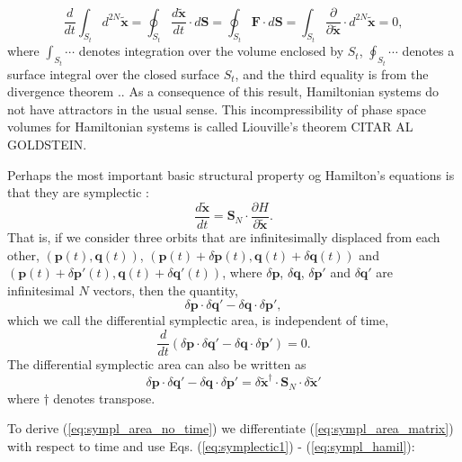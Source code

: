 \begin{equation}
\frac{d}{dt}\int_{S_t}d^{2N}\tilde{\bm{x}}= \oint_{S_t}\frac{d\tilde{\bm{x}}}{dt}\cdot d\bm{S}=\oint_{S_t}\bm{F}\cdot d\bm{S}=\int_{S_t}\frac{\partial }{\partial \tilde{\bm{x}}}\cdot d^{2N}\tilde{\bm{x}}=0,
\end{equation}
where $\int_{S_t} \cdots$ denotes integration over the volume enclosed by $S_t$, $ \oint_{S_t}\cdots$ denotes a surface integral over the closed surface $S_t$, and the third equality is from the divergence theorem \cite{ottChaosDynamicalSystems2002}.. As a consequence of this result, Hamiltonian systems do not have attractors in the usual sense. This incompressibility of phase space volumes for Hamiltonian systems is called Liouville's theorem \cite{ottChaosDynamicalSystems2002}
CITAR AL GOLDSTEIN.\par

Perhaps the most important basic structural property og Hamilton's equations is that they are symplectic \cite{ottChaosDynamicalSystems2002}:
\begin{equation}
\frac{d\tilde{\bm{x}}}{dt}=\bm{S}_N\cdot \frac{\partial H}{\partial \tilde{\bm{x}}}.
\end{equation}
That is, if we consider three orbits that are infinitesimally displaced from each other, $(\bm{p}(t),\bm{q}(t))$, $(\bm{p}(t)+\delta \bm{p}(t),\bm{q}(t)+\delta \bm{q}(t))$ and $(\bm{p}(t)+\delta \bm{p}'(t),\bm{q}(t)+\delta \bm{q}'(t))$, where $\delta \bm{p}$, $\delta \bm{q}$, $\delta \bm{p}'$ and $\delta \bm{q}'$ are infinitesimal $N$ vectors, then the quantity,
\begin{equation}
\delta \bm{p}\cdot \delta \bm{q}'-\delta \bm{q}\cdot \delta \bm{p}',
\end{equation}
which we call the differential symplectic area, is independent of time,
\begin{equation}
\frac{d}{dt}(\delta\bm{p}\cdot\delta\bm{q}'-\delta\bm{q}\cdot\delta\bm{p}')=0.
\label{eq:sympl_area_no_time}
\end{equation}
The differential symplectic area can also be written as
\begin{equation}
\delta\bm{p}\cdot\delta\bm{q}'-\delta\bm{q}\cdot\delta\bm{p}'=\delta\tilde{\bm{x}}^{\dagger}\cdot\bm{S}_N\cdot \delta \tilde{\bm{x}}'
\label{eq:sympl_area_matrix}
\end{equation}
where $\dagger$ denotes transpose.\par

To derive (\ref{eq:sympl_area_no_time}) we differentiate (\ref{eq:sympl_area_matrix}) with respect to time and use Eqs. (\ref{eq:symplectic1}) - (\ref{eq:sympl_hamil}):

